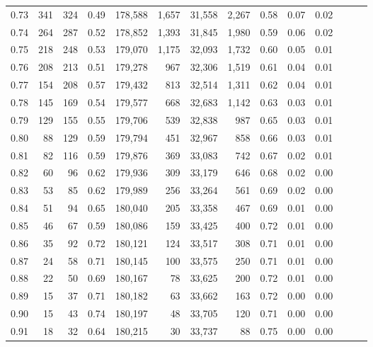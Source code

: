 \begin{tabular}{rrrrrrrrrrrrrr}
0.73 &    341 &    324 &  0.49 &  178,588 &    1,657 &  31,558 &   2,267 &  0.58 &  0.07 &      0.02 \\
0.74 &    264 &    287 &  0.52 &  178,852 &    1,393 &  31,845 &   1,980 &  0.59 &  0.06 &      0.02 \\
0.75 &    218 &    248 &  0.53 &  179,070 &    1,175 &  32,093 &   1,732 &  0.60 &  0.05 &      0.01 \\
0.76 &    208 &    213 &  0.51 &  179,278 &      967 &  32,306 &   1,519 &  0.61 &  0.04 &      0.01 \\
0.77 &    154 &    208 &  0.57 &  179,432 &      813 &  32,514 &   1,311 &  0.62 &  0.04 &      0.01 \\
0.78 &    145 &    169 &  0.54 &  179,577 &      668 &  32,683 &   1,142 &  0.63 &  0.03 &      0.01 \\
0.79 &    129 &    155 &  0.55 &  179,706 &      539 &  32,838 &     987 &  0.65 &  0.03 &      0.01 \\
0.80 &     88 &    129 &  0.59 &  179,794 &      451 &  32,967 &     858 &  0.66 &  0.03 &      0.01 \\
0.81 &     82 &    116 &  0.59 &  179,876 &      369 &  33,083 &     742 &  0.67 &  0.02 &      0.01 \\
0.82 &     60 &     96 &  0.62 &  179,936 &      309 &  33,179 &     646 &  0.68 &  0.02 &      0.00 \\
0.83 &     53 &     85 &  0.62 &  179,989 &      256 &  33,264 &     561 &  0.69 &  0.02 &      0.00 \\
0.84 &     51 &     94 &  0.65 &  180,040 &      205 &  33,358 &     467 &  0.69 &  0.01 &      0.00 \\
0.85 &     46 &     67 &  0.59 &  180,086 &      159 &  33,425 &     400 &  0.72 &  0.01 &      0.00 \\
0.86 &     35 &     92 &  0.72 &  180,121 &      124 &  33,517 &     308 &  0.71 &  0.01 &      0.00 \\
0.87 &     24 &     58 &  0.71 &  180,145 &      100 &  33,575 &     250 &  0.71 &  0.01 &      0.00 \\
0.88 &     22 &     50 &  0.69 &  180,167 &       78 &  33,625 &     200 &  0.72 &  0.01 &      0.00 \\
0.89 &     15 &     37 &  0.71 &  180,182 &       63 &  33,662 &     163 &  0.72 &  0.00 &      0.00 \\
0.90 &     15 &     43 &  0.74 &  180,197 &       48 &  33,705 &     120 &  0.71 &  0.00 &      0.00 \\
0.91 &     18 &     32 &  0.64 &  180,215 &       30 &  33,737 &      88 &  0.75 &  0.00 &      0.00 \\

\end{tabular}
